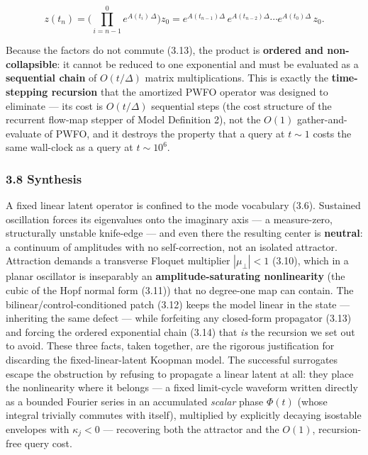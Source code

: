 \documentclass[
  11pt,
]{article}
\providecommand{\lt}{<}
\begin{document}
\[
z(t_n)=\Big(\textstyle\prod_{i=n-1}^{0} e^{A(t_i)\,\Delta}\Big)z_0
= e^{A(t_{n-1})\Delta}\,e^{A(t_{n-2})\Delta}\cdots e^{A(t_0)\Delta}\,z_0 .
\tag{3.14}
\]

Because the factors do not commute (3.13), the product is
\textbf{ordered and non-collapsible}: it cannot be reduced to one
exponential and must be evaluated as a \textbf{sequential chain} of
\(O(t/\Delta)\) matrix multiplications. This is exactly the
\textbf{time-stepping recursion} that the amortized PWFO operator was
designed to eliminate --- its cost is \(O(t/\Delta)\) sequential steps
(the cost structure of the recurrent flow-map stepper of Model
Definition 2), not the \(O(1)\) gather-and-evaluate of PWFO, and it
destroys the property that a query at \(t\sim 1\) costs the same
wall-clock as a query at \(t\sim 10^{6}\).

\subsubsection{3.8 Synthesis}\label{synthesis}

A fixed linear latent operator is confined to the mode vocabulary (3.6).
Sustained oscillation forces its eigenvalues onto the imaginary axis ---
a measure-zero, structurally unstable knife-edge --- and even there the
resulting center is \textbf{neutral}: a continuum of amplitudes with no
self-correction, not an isolated attractor. Attraction demands a
transverse Floquet multiplier \(|\mu_\perp|\lt 1\) (3.10), which in a
planar oscillator is inseparably an \textbf{amplitude-saturating
nonlinearity} (the cubic of the Hopf normal form (3.11)) that no
degree-one map can contain. The bilinear/control-conditioned patch
(3.12) keeps the model linear in the state --- inheriting the same
defect --- while forfeiting any closed-form propagator (3.13) and
forcing the ordered exponential chain (3.14) that \emph{is} the
recursion we set out to avoid. These three facts, taken together, are
the rigorous justification for discarding the fixed-linear-latent
Koopman model. The successful surrogates escape the obstruction by
refusing to propagate a linear latent at all: they place the
nonlinearity where it belongs --- a fixed limit-cycle waveform written
directly as a bounded Fourier series in an accumulated \emph{scalar}
phase \(\Phi(t)\) (whose integral trivially commutes with itself),
multiplied by explicitly decaying isostable envelopes with
\(\kappa_j\lt 0\) --- recovering both the attractor and the \(O(1)\),
recursion-free query cost.
\end{document}

